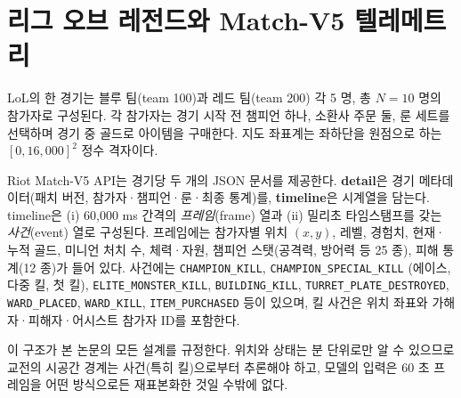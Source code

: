 
\section{리그 오브 레전드와 Match-V5 텔레메트리}
\label{sec:bg-telemetry}

LoL의 한 경기는 블루 팀(team 100)과 레드 팀(team 200) 각 5 명, 총 $N=10$ 명의 참가자로 구성된다. 각 참가자는 경기 시작 전 챔피언 하나, 소환사 주문 둘, 룬 세트를 선택하며 경기 중 골드로 아이템을 구매한다. 지도 좌표계는 좌하단을 원점으로 하는 $[0, 16{,}000]^2$ 정수 격자이다.

Riot Match-V5 API는 경기당 두 개의 JSON 문서를 제공한다. \textbf{detail}은 경기 메타데이터(패치 버전, 참가자·챔피언·룬·최종 통계)를, \textbf{timeline}은 시계열을 담는다. timeline은 (i) 60{,}000 ms 간격의 \emph{프레임}(frame) 열과 (ii) 밀리초 타임스탬프를 갖는 \emph{사건}(event) 열로 구성된다. 프레임에는 참가자별 위치 $(x, y)$, 레벨, 경험치, 현재·누적 골드, 미니언 처치 수, 체력·자원, 챔피언 스탯(공격력, 방어력 등 25 종), 피해 통계(12 종)가 들어 있다. 사건에는 \texttt{CHAMPION\_KILL}, \texttt{CHAMPION\_SPECIAL\_KILL} (에이스, 다중 킬, 첫 킬), \texttt{ELITE\_MONSTER\_KILL}, \texttt{BUILDING\_KILL}, \texttt{TURRET\_PLATE\_DESTROYED}, \texttt{WARD\_PLACED}, \texttt{WARD\_KILL}, \texttt{ITEM\_PURCHASED} 등이 있으며, 킬 사건은 위치 좌표와 가해자·피해자·어시스트 참가자 ID를 포함한다.

이 구조가 본 논문의 모든 설계를 규정한다. 위치와 상태는 분 단위로만 알 수 있으므로 교전의 시공간 경계는 사건(특히 킬)으로부터 추론해야 하고, 모델의 입력은 60 초 프레임을 어떤 방식으로든 재표본화한 것일 수밖에 없다.
